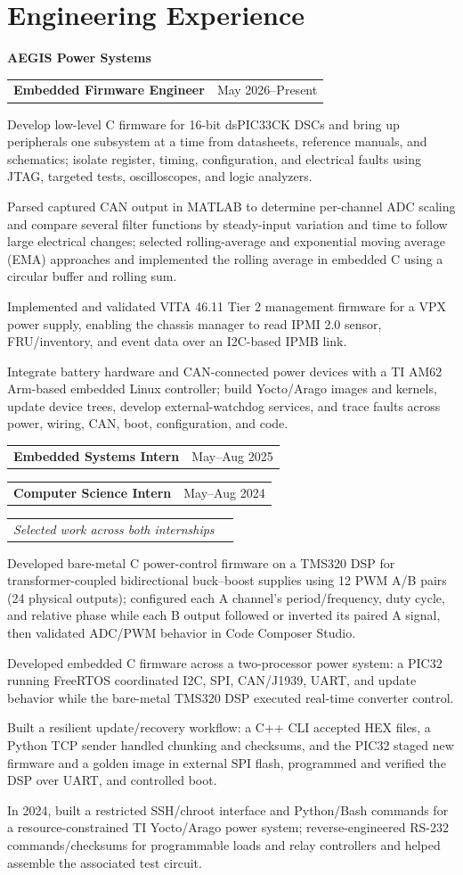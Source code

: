\documentclass[10pt,letterpaper]{article}
\makeatletter
\newcommand{\companyheader}[1]{%
  {\fontsize{10.4}{10.8}\selectfont\bfseries #1}\par\vspace{-0.03cm}
}
\newcommand{\roleentry}[2]{%
  \begin{tabularx}{\textwidth}{@{}X>{\raggedleft\arraybackslash}p{2.40in}@{}}
    \textbf{#1} & #2
  \end{tabularx}\vspace{-0.075cm}
}
\newcommand{\descriptorentry}[1]{%
  \begin{tabularx}{\textwidth}{@{}X>{\raggedleft\arraybackslash}p{2.40in}@{}}
    \textit{#1} &
  \end{tabularx}\vspace{-0.075cm}
}
\makeatother
\begin{document}
\section{Engineering Experience}
\companyheader{AEGIS Power Systems}
\roleentry{Embedded Firmware Engineer}{May 2026--Present}
\begin{resumebullets}
  \item Develop low-level C firmware for 16-bit dsPIC33CK DSCs and bring up peripherals one subsystem at a time from datasheets, reference manuals, and schematics; isolate register, timing, configuration, and electrical faults using JTAG, targeted tests, oscilloscopes, and logic analyzers.
  \item Parsed captured CAN output in MATLAB to determine per-channel ADC scaling and compare several filter functions by steady-input variation and time to follow large electrical changes; selected rolling-average and exponential moving average (EMA) approaches and implemented the rolling average in embedded C using a circular buffer and rolling sum.
  \item Implemented and validated VITA 46.11 Tier 2 management firmware for a VPX power supply, enabling the chassis manager to read IPMI 2.0 sensor, FRU/inventory, and event data over an I2C-based IPMB link.
  \item Integrate battery hardware and CAN-connected power devices with a TI AM62 Arm-based embedded Linux controller; build Yocto/Arago images and kernels, update device trees, develop external-watchdog services, and trace faults across power, wiring, CAN, boot, configuration, and code.
\end{resumebullets}

\roleentry{Embedded Systems Intern}{May--Aug 2025}
\roleentry{Computer Science Intern}{May--Aug 2024}
\descriptorentry{Selected work across both internships}
\begin{resumebullets}
  \item Developed bare-metal C power-control firmware on a TMS320 DSP for transformer-coupled bidirectional buck--boost supplies using 12 PWM A/B pairs (24 physical outputs); configured each A channel's period/frequency, duty cycle, and relative phase while each B output followed or inverted its paired A signal, then validated ADC/PWM behavior in Code Composer Studio.
  \item Developed embedded C firmware across a two-processor power system: a PIC32 running FreeRTOS coordinated I2C, SPI, CAN/J1939, UART, and update behavior while the bare-metal TMS320 DSP executed real-time converter control.
  \item Built a resilient update/recovery workflow: a C++ CLI accepted HEX files, a Python TCP sender handled chunking and checksums, and the PIC32 staged new firmware and a golden image in external SPI flash, programmed and verified the DSP over UART, and controlled boot.
  \item In 2024, built a restricted SSH/chroot interface and Python/Bash commands for a resource-constrained TI Yocto/Arago power system; reverse-engineered RS-232 commands/checksums for programmable loads and relay controllers and helped assemble the associated test circuit.
\end{resumebullets}
\end{document}
